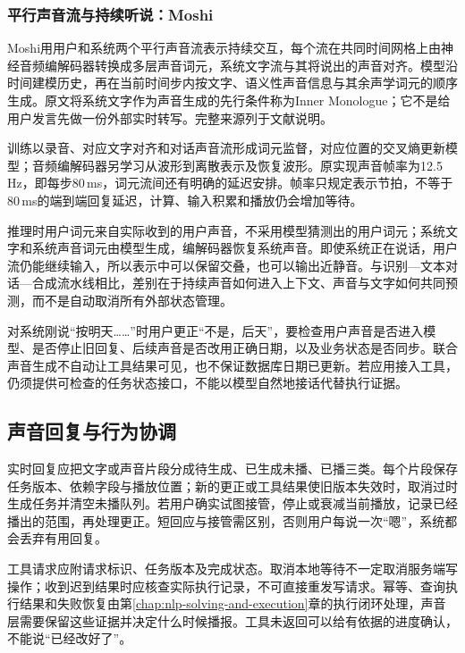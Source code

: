 \subsubsection{平行声音流与持续听说：Moshi}
\label{sec:nlp-speech-moshi}

Moshi用用户和系统两个平行声音流表示持续交互，每个流在共同时间网格上由神经音频编解码器转换成多层声音词元，系统文字流与其将说出的声音对齐。模型沿时间建模历史，再在当前时间步内按文字、语义性声音信息与其余声学词元的顺序生成。原文将系统文字作为声音生成的先行条件称为Inner Monologue；它不是给用户发言先做一份外部实时转写。完整来源列于文献说明。

训练以录音、对应文字对齐和对话声音流形成词元监督，对应位置的交叉熵更新模型；音频编解码器另学习从波形到离散表示及恢复波形。原实现声音帧率为12.5\,Hz，即每步80\,ms，词元流间还有明确的延迟安排。帧率只规定表示节拍，不等于80\,ms的端到端回复延迟，计算、输入积累和播放仍会增加等待。

推理时用户词元来自实际收到的用户声音，不采用模型猜测出的用户词元；系统文字和系统声音词元由模型生成，编解码器恢复系统声音。即使系统正在说话，用户流仍能继续输入，所以表示中可以保留交叠，也可以输出近静音。与识别—文本对话—合成流水线相比，差别在于持续声音如何进入上下文、声音与文字如何共同预测，而不是自动取消所有外部状态管理。

对系统刚说“按明天……”时用户更正“不是，后天”，要检查用户声音是否进入模型、是否停止旧回复、后续声音是否改用正确日期，以及业务状态是否同步。联合声音生成不自动让工具结果可见，也不保证数据库日期已更新。若应用接入工具，仍须提供可检查的任务状态接口，不能以模型自然地接话代替执行证据。

\subsection{声音回复与行为协调}
\label{sec:nlp-speech-coordination}

实时回复应把文字或声音片段分成待生成、已生成未播、已播三类。每个片段保存任务版本、依赖字段与播放位置；新的更正或工具结果使旧版本失效时，取消过时生成任务并清空未播队列。若用户确实试图接管，停止或衰减当前播放，记录已经播出的范围，再处理更正。短回应与接管需区别，否则用户每说一次“嗯”，系统都会丢弃有用回复。

工具请求应附请求标识、任务版本及完成状态。取消本地等待不一定取消服务端写操作；收到迟到结果时应核查实际执行记录，不可直接重发写请求。幂等、查询执行结果和失败恢复由第\ref{chap:nlp-solving-and-execution}章的执行闭环处理，声音层需要保留这些证据并决定什么时候播报。工具未返回可以给有依据的进度确认，不能说“已经改好了”。

